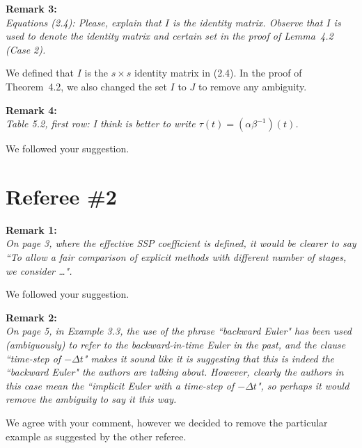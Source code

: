 \documentclass[12pt]{article}
\newcommand{\remark}[2]{\vspace{25pt} \noindent \textbf{Remark #1:\newline} \textit{#2}\vspace{15pt}}
\renewcommand{\newline}{\vspace{15pt}\\}
\begin{document}
\remark{3}{
Equations (2.4): Please, explain that $I$ is the identity matrix. Observe that $I$ is used to
denote the identity matrix and certain set in the proof of Lemma~4.2 (Case 2).}

We defined that $I$ is the $s \times s$ identity matrix in (2.4).
In the proof of Theorem~4.2, we also changed the set $I$ to $J$ to remove any ambiguity.

\remark{4}{
Table 5.2, first row: I think is better to write $\tau(t) = (\alpha\beta^{-1})(t)$.}

We followed your suggestion.

\vspace{50pt}

\section*{Referee \#2}
\remark{1}{
On page 3, where the effective SSP coefficient is defined, it would be clearer to say
``To allow a fair comparison of explicit methods with different number of stages, we consider \dots". }

We followed your suggestion.

\remark{2}{
On page 5, in Example 3.3, the use of the phrase ``backward Euler" has been used 
(ambiguously) to refer to the backward-in-time Euler in the past, and the clause 
``time-step of $-\Delta t$" makes it sound like it is suggesting that this is indeed 
the ``backward Euler" the authors are talking about. 
However, clearly the authors in this case mean the ``implicit Euler with a time-step 
of $-\Delta t$", so perhaps it would remove the ambiguity to say it this way.}

We agree with your comment, however we decided to remove the particular example 
as suggested by the other referee.
\end{document}
